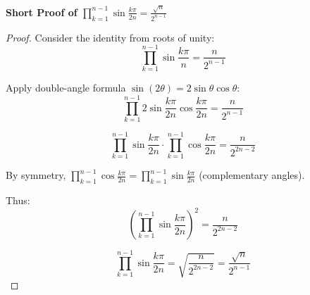 \documentclass[10pt]{article}
\begin{document}
\textbf{Short Proof of $\prod_{k=1}^{n-1} \sin\frac{k\pi}{2n} = \frac{\sqrt{n}}{2^{n-1}}$}

\begin{proof}

Consider the identity from roots of unity:
\[
\prod_{k=1}^{n-1} \sin\frac{k\pi}{n} = \frac{n}{2^{n-1}}
\]

Apply double-angle formula $\sin(2\theta) = 2\sin\theta\cos\theta$:
\[
\prod_{k=1}^{n-1} 2\sin\frac{k\pi}{2n}\cos\frac{k\pi}{2n} = \frac{n}{2^{n-1}}
\]

\[
\prod_{k=1}^{n-1} \sin\frac{k\pi}{2n} \cdot \prod_{k=1}^{n-1} \cos\frac{k\pi}{2n} = \frac{n}{2^{2n-2}}
\]

By symmetry, $\prod_{k=1}^{n-1} \cos\frac{k\pi}{2n} = \prod_{k=1}^{n-1} \sin\frac{k\pi}{2n}$ (complementary angles).

Thus:
\[
\left(\prod_{k=1}^{n-1} \sin\frac{k\pi}{2n}\right)^2 = \frac{n}{2^{2n-2}}
\]

\[
\prod_{k=1}^{n-1} \sin\frac{k\pi}{2n} = \sqrt{\frac{n}{2^{2n-2}}} = \frac{\sqrt{n}}{2^{n-1}}
\]

\end{proof}
\end{document}
